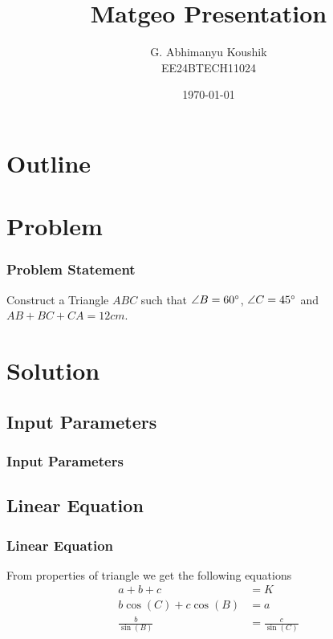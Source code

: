\documentclass{beamer}
\title{Matgeo Presentation}
\author{G. Abhimanyu Koushik \\ EE24BTECH11024}
\date{\today}
\theoremstyle{remark}
\numberwithin{equation}{section}
\begin{document}
\begin{frame}
\titlepage
\end{frame}

\section*{Outline}
\begin{frame}
\tableofcontents
\end{frame}
\section{Problem}
\begin{frame}
\frametitle{Problem Statement}
%
Construct a Triangle $ABC$ such that $\angle B=60\degree$, $\angle C=45\degree$ and $AB+BC+CA=12cm$.
%
\end{frame}

\section{Solution}
\subsection{Input Parameters}
\begin{frame}
\frametitle{Input Parameters}
\begin{table}[H]    
  \centering
  
\end{table}
\end{frame}
\subsection{Linear Equation}
\begin{frame}
\frametitle{Linear Equation}
From properties of triangle we get the following equations
%
\begin{align}
a+b+c&=K\\
b\cos(C)+c\cos(B)&=a\\
\frac{b}{\sin(B)}&=\frac{c}{\sin(C)}
\end{align}
%
\end{frame}
\end{document}
